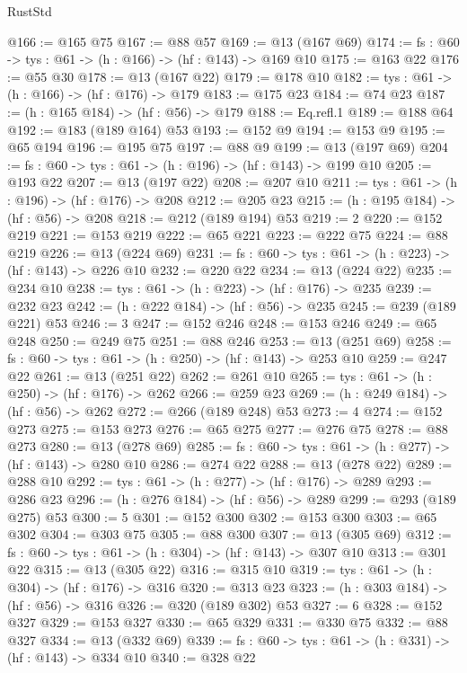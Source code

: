 \begin{lexlean}{RustStd}
\begin{coremodule}
@166 := @165 @75
@167 := @88 @57
@169 := @13 (@167 @69)
@174 := {fs : @60} -> {tys : @61} -> (h : @166) -> (hf : @143) -> @169 @10
@175 := @163 @22
@176 := @55 @30
@178 := @13 (@167 @22)
@179 := @178 @10
@182 := {tys : @61} -> (h : @166) -> (hf : @176) -> @179
@183 := @175 @23
@184 := @74 @23
@187 := (h : @165 @184) -> (hf : @56) -> @179
@188 := Eq.refl.{1}
@189 := @188 @64
@192 := @183 (@189 @164) @53
@193 := @152 @9
@194 := @153 @9
@195 := @65 @194
@196 := @195 @75
@197 := @88 @9
@199 := @13 (@197 @69)
@204 := {fs : @60} -> {tys : @61} -> (h : @196) -> (hf : @143) -> @199 @10
@205 := @193 @22
@207 := @13 (@197 @22)
@208 := @207 @10
@211 := {tys : @61} -> (h : @196) -> (hf : @176) -> @208
@212 := @205 @23
@215 := (h : @195 @184) -> (hf : @56) -> @208
@218 := @212 (@189 @194) @53
@219 := 2
@220 := @152 @219
@221 := @153 @219
@222 := @65 @221
@223 := @222 @75
@224 := @88 @219
@226 := @13 (@224 @69)
@231 := {fs : @60} -> {tys : @61} -> (h : @223) -> (hf : @143) -> @226 @10
@232 := @220 @22
@234 := @13 (@224 @22)
@235 := @234 @10
@238 := {tys : @61} -> (h : @223) -> (hf : @176) -> @235
@239 := @232 @23
@242 := (h : @222 @184) -> (hf : @56) -> @235
@245 := @239 (@189 @221) @53
@246 := 3
@247 := @152 @246
@248 := @153 @246
@249 := @65 @248
@250 := @249 @75
@251 := @88 @246
@253 := @13 (@251 @69)
@258 := {fs : @60} -> {tys : @61} -> (h : @250) -> (hf : @143) -> @253 @10
@259 := @247 @22
@261 := @13 (@251 @22)
@262 := @261 @10
@265 := {tys : @61} -> (h : @250) -> (hf : @176) -> @262
@266 := @259 @23
@269 := (h : @249 @184) -> (hf : @56) -> @262
@272 := @266 (@189 @248) @53
@273 := 4
@274 := @152 @273
@275 := @153 @273
@276 := @65 @275
@277 := @276 @75
@278 := @88 @273
@280 := @13 (@278 @69)
@285 := {fs : @60} -> {tys : @61} -> (h : @277) -> (hf : @143) -> @280 @10
@286 := @274 @22
@288 := @13 (@278 @22)
@289 := @288 @10
@292 := {tys : @61} -> (h : @277) -> (hf : @176) -> @289
@293 := @286 @23
@296 := (h : @276 @184) -> (hf : @56) -> @289
@299 := @293 (@189 @275) @53
@300 := 5
@301 := @152 @300
@302 := @153 @300
@303 := @65 @302
@304 := @303 @75
@305 := @88 @300
@307 := @13 (@305 @69)
@312 := {fs : @60} -> {tys : @61} -> (h : @304) -> (hf : @143) -> @307 @10
@313 := @301 @22
@315 := @13 (@305 @22)
@316 := @315 @10
@319 := {tys : @61} -> (h : @304) -> (hf : @176) -> @316
@320 := @313 @23
@323 := (h : @303 @184) -> (hf : @56) -> @316
@326 := @320 (@189 @302) @53
@327 := 6
@328 := @152 @327
@329 := @153 @327
@330 := @65 @329
@331 := @330 @75
@332 := @88 @327
@334 := @13 (@332 @69)
@339 := {fs : @60} -> {tys : @61} -> (h : @331) -> (hf : @143) -> @334 @10
@340 := @328 @22

\end{coremodule}
\end{lexlean}
